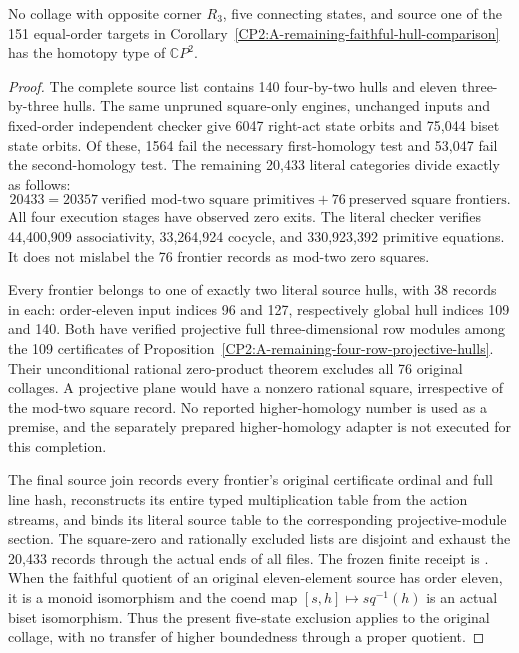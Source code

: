 \begin{lemma}
\label{CP2:A-eleven-actual-remaining-hulls-complete}
No collage with opposite corner $R_3$, five connecting states,
and source one of the 151 equal-order targets in
Corollary~\ref{CP2:A-remaining-faithful-hull-comparison}
has the homotopy type of $\mathbb CP^2$.
\end{lemma}
\begin{proof}
The complete source list contains 140 four-by-two hulls and
eleven three-by-three hulls.  The same unpruned square-only
engines, unchanged inputs and fixed-order independent checker
give 6047 right-act state orbits and 75,044 biset state orbits.
Of these, 1564 fail the necessary first-homology test and
53,047 fail the second-homology test.  The remaining 20,433
literal categories divide exactly as follows:
\[
 20433=20357\ \text{verified mod-two square primitives}
          +76\ \text{preserved square frontiers}.
\]
All four execution stages have observed zero exits.  The literal
checker verifies 44,400,909 associativity, 33,264,924 cocycle,
and 330,923,392 primitive equations.  It does not mislabel the
76 frontier records as mod-two zero squares.

Every frontier belongs to one of exactly two literal source
hulls, with 38 records in each: order-eleven input indices 96
and 127, respectively global hull indices 109 and 140.  Both
have verified projective full three-dimensional row modules
among the 109 certificates of
Proposition~\ref{CP2:A-remaining-four-row-projective-hulls}.
Their unconditional rational zero-product theorem excludes
all 76 original collages.  A projective plane would have a
nonzero rational square, irrespective of the mod-two square
record.  No reported higher-homology number is used as a
premise, and the separately prepared higher-homology adapter
is not executed for this completion.

The final source join records every frontier's original
certificate ordinal and full line hash, reconstructs its
entire typed multiplication table from the action streams,
and binds its literal source table to the corresponding
projective-module section.  The square-zero and rationally
excluded lists are disjoint and exhaust the 20,433 records
through the actual ends of all files.  The frozen finite
receipt is
.
When the faithful quotient of an original eleven-element
source has order eleven, it is a monoid isomorphism and the
coend map $[s,h]\mapsto s q^{-1}(h)$ is an actual biset
isomorphism.  Thus the present five-state exclusion applies
to the original collage, with no transfer of higher
boundedness through a proper quotient.
\end{proof}

